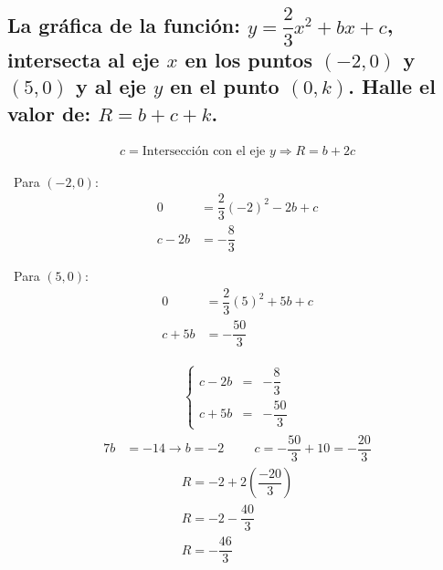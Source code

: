 \documentclass[10pt, a4paper]{article}
\begin{document}
\begin{multicols*}{2}
  \subsection{\small La gráfica de la función: $y=\dfrac{2}{3}x^2+bx+c$, intersecta al eje $x$ en los puntos $\left(-2,0\right)$ y $\left(5,0\right)$ y al eje $y$ en el punto $\left(0,k\right)$. Halle el valor de: $R=b+c+k$.}
  \vspace{-0.2cm}
  \begin{align*}
    c = \text{Intersección con el eje } y \Rightarrow R=b+2c
  \end{align*}
  \vspace{-0.6cm}
  \begingroup
\setlength{\columnseprule}{0pt} %
\begin{multicols*}{2}
    \parbox{\linewidth}{
        \textbullet \ Para $\left(-2,0\right)$:
        \begin{align*}
            0 &= \dfrac{2}{3}\left(-2\right)^2-2b+c\\
            c-2b &= -\dfrac{8}{3}
        \end{align*}
    }
    \columnbreak
    \parbox{\linewidth}{
        \textbullet \ Para $\left(5,0\right)$:
        \begin{align*}
            0 &= \dfrac{2}{3}\left(5\right)^2+5b+c\\
            c+5b &= -\dfrac{50}{3}
        \end{align*}
    }
\end{multicols*}
\endgroup
{}
\vspace{-0.1cm}
\begin{align*}
    \left\{
    \begin{array}{rcl}
        c-2b &= &-\dfrac{8}{3}\\
        c+5b &= &-\dfrac{50}{3}
    \end{array}
    \right.
\end{align*}
\vspace{-0.4cm}
\begin{align*}
    7b &= -14 \rightarrow b = -2 \hspace{1cm} c = -\dfrac{50}{3}+10 = -\dfrac{20}{3}
\end{align*}
\vspace{-0.6cm}
\begin{align*}
  R = -2+2\left(\dfrac{-20}{3}\right)\\
  R = -2-\dfrac{40}{3}\\
  R = -\dfrac{46}{3}
\end{align*}

\end{multicols*}
\end{document}
